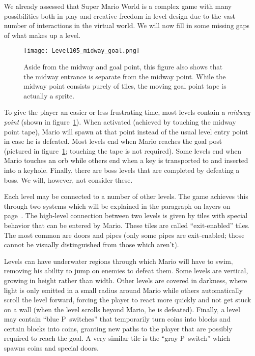 We already assessed that Super Mario World is a complex game with many
possibilities both in play and creative freedom in level design due to
the vast number of interactions in the virtual world. We will now fill
in some missing gaps of what makes up a level.

\begin{figure}[t]
  \centering
  \texttt{[image: Level105\_midway\_goal.png]}
  \caption{Aside from the midway and goal point, this figure also
    shows that the midway entrance is separate from the midway point.
    While the midway point consists purely of tiles, the moving goal
    point tape is actually a sprite.}
  \label{fig:midway-goal}
\end{figure}

To give the player an easier or less frustrating time, most levels
contain a \emph{midway point} (shown in figure~\ref{fig:midway-goal}).
When activated (achieved by touching the midway point tape), Mario
will spawn at that point instead of the usual level entry point in
case he is defeated. Most levels end when Mario reaches the goal post
(pictured in figure~\ref{fig:midway-goal}; touching the tape is not
required). Some levels end when Mario touches an orb while others end
when a key is transported to and inserted into a keyhole. Finally,
there are boss levels that are completed by defeating a boss. We will,
however, not consider these.

Each level may be connected to a number of other levels. The game
achieves this through two systems which will be explained in the
paragraph on layers on page~\pageref{par:layers}. The high-level
connection between two levels is given by tiles with special behavior
that can be entered by Mario. These tiles are called ``exit-enabled''
tiles. The most common are doors and pipes (only some pipes are
exit-enabled; those cannot be visually distinguished from those which
aren't).

Levels can have underwater regions through which Mario will have to
swim, removing his ability to jump on enemies to defeat them. Some
levels are vertical, growing in height rather than width. Other levels
are covered in darkness, where light is only emitted in a small radius
around Mario while others automatically scroll the level forward,
forcing the player to react more quickly and not get stuck on a wall
(when the level scrolls beyond Mario, he is defeated). Finally, a
level may contain ``blue P~switches'' that temporarily turn coins into
blocks and certain blocks into coins, granting new paths to the player
that are possibly required to reach the goal. A very similar tile is
the ``gray P~switch'' which spawns coins and special doors.

